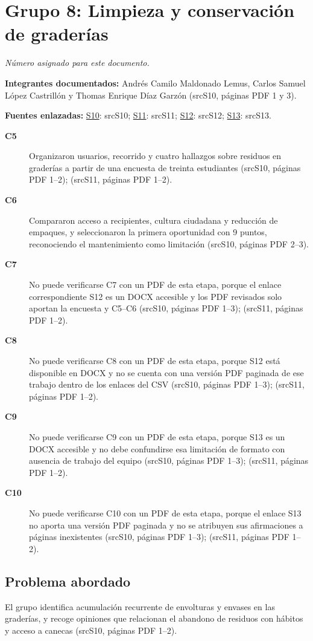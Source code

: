 \documentclass[11pt,a4paper]{article}
\newcommand{\evid}[2]{(\csname src#1\endcsname, páginas PDF #2)}
\begin{document}
\section*{Grupo 8: Limpieza y conservación de graderías}
\textit{Número asignado para este documento.}

\textbf{Integrantes documentados:} Andrés Camilo Maldonado Lemus, Carlos Samuel López Castrillón y Thomas Enrique Díaz Garzón \evid{S10}{1 y 3}.

\textbf{Fuentes enlazadas:} \hyperlink{fuente-S10}{S10}: \csname srcS10\endcsname; \hyperlink{fuente-S11}{S11}: \csname srcS11\endcsname; \hyperlink{fuente-S12}{S12}: \csname srcS12\endcsname; \hyperlink{fuente-S13}{S13}: \csname srcS13\endcsname.

\begin{description}
\item[\textbf{C5}] Organizaron usuarios, recorrido y cuatro hallazgos sobre residuos en graderías a partir de una encuesta de treinta estudiantes \evid{S10}{1--2}; \evid{S11}{1--2}.
\item[\textbf{C6}] Compararon acceso a recipientes, cultura ciudadana y reducción de empaques, y seleccionaron la primera oportunidad con 9 puntos, reconociendo el mantenimiento como limitación \evid{S10}{2--3}.
\item[\textbf{C7}] No puede verificarse C7 con un PDF de esta etapa, porque el enlace correspondiente S12 es un DOCX accesible y los PDF revisados solo aportan la encuesta y C5--C6 \evid{S10}{1--3}; \evid{S11}{1--2}.
\item[\textbf{C8}] No puede verificarse C8 con un PDF de esta etapa, porque S12 está disponible en DOCX y no se cuenta con una versión PDF paginada de ese trabajo dentro de los enlaces del CSV \evid{S10}{1--3}; \evid{S11}{1--2}.
\item[\textbf{C9}] No puede verificarse C9 con un PDF de esta etapa, porque S13 es un DOCX accesible y no debe confundirse esa limitación de formato con ausencia de trabajo del equipo \evid{S10}{1--3}; \evid{S11}{1--2}.
\item[\textbf{C10}] No puede verificarse C10 con un PDF de esta etapa, porque el enlace S13 no aporta una versión PDF paginada y no se atribuyen sus afirmaciones a páginas inexistentes \evid{S10}{1--3}; \evid{S11}{1--2}.
\end{description}
\subsection*{Problema abordado}
El grupo identifica acumulación recurrente de envolturas y envases en las graderías, y recoge opiniones que relacionan el abandono de residuos con hábitos y acceso a canecas \evid{S10}{1--2}.
\end{document}
